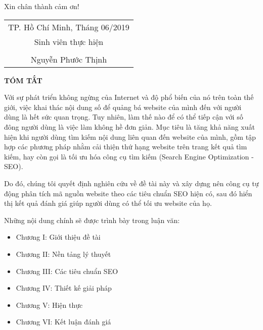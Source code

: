 \vspace{1em}
\par
Xin chân thành cảm ơn!
\vspace{10mm}
\begin{table}[!ht]
    \raggedleft
    \begin{tabular}{c}
        TP. Hồ Chí Minh, Tháng 06/2019\\
        Sinh viên thực hiện\\
        \vspace{5mm}\\
        Nguyễn Phước Thịnh\\
    \end{tabular}
\end{table}
\thispagestyle{empty}
\cleardoublepage
\begin{center}
    \Large{\textbf{TÓM TẮT}}
\end{center}
\vspace{10mm}
\par
Với sự phát triển không ngừng của Internet và độ phổ biến của nó trên toàn thế giới, việc khai thác nội dung số để quảng bá website của mình đến với người dùng là hết sức quan trọng. Tuy nhiên, làm thế nào để có thể tiếp cận với số đông người dùng là việc làm không hề đơn giản. Mục tiêu là tăng khả năng xuất hiện khi người dùng tìm kiếm nội dung liên quan đến website của mình, gồm tập hợp các phương pháp nhằm cải thiện thứ hạng website trên trang kết quả tìm kiếm, hay còn gọi là tối ưu hóa công cụ tìm kiếm (Search Engine Optimization - SEO).
\vspace{1em}
\par
Do đó, chúng tôi quyết định nghiên cứu về đề tài này và xây dựng nên công cụ tự động phân tích mã nguồn website theo các tiêu chuẩn SEO hiện có, sau đó hiển thị kết quả đánh giá giúp người dùng có thể tối ưu website của họ.
\vspace{1em}
\par
Những nội dung chính sẽ được trình bày trong luận văn:
\begin{itemize}
    \item Chương I: Giới thiệu đề tài
    \item Chương II: Nền tảng lý thuyết
    \item Chương III: Các tiêu chuẩn SEO
    \item Chương IV: Thiết kế giải pháp
    \item Chương V: Hiện thực
    \item Chương VI: Kết luận đánh giá
\end{itemize}
\thispagestyle{empty}
\cleardoublepage